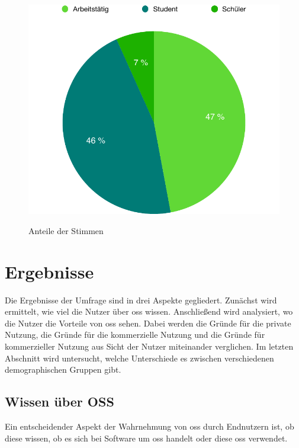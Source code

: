 \documentclass[a4paper]{article}
\begin{document}
\begin{figure}[h]
            \centering
            \begin{minipage}{.5\textwidth}
                \centering
                \includegraphics[width=\textwidth]{assets/results/validity/rowsPerActivity}
                \label{fig:rowsPer:activity}
            \end{minipage}
            \caption{Anteile der Stimmen}
        \end{figure}

    \clearpage
    \section{Ergebnisse}
    
        Die Ergebnisse der Umfrage sind in drei Aspekte gegliedert. Zunächst wird ermittelt, wie viel die Nutzer über \gls{oss} wissen. Anschließend wird analysiert, wo die Nutzer die Vorteile von \gls{oss} sehen. Dabei werden die Gründe für die private Nutzung, die Gründe für die kommerzielle Nutzung und die Gründe für kommerzieller Nutzung aus Sicht der Nutzer miteinander verglichen. Im letzten Abschnitt wird untersucht, welche Unterschiede es zwischen verschiedenen demographischen Gruppen gibt.
        
        \subsection{Wissen über OSS}\label{section:knowledge_oss}
            Ein entscheidender Aspekt der Wahrnehmung von \gls{oss} durch Endnutzern ist, ob diese wissen, ob es sich bei Software um \gls{oss} handelt oder diese \gls{oss} verwendet.
            
\end{document}
